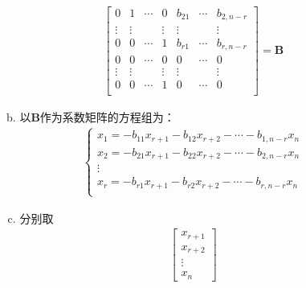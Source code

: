 \documentclass[12pt]{book}
\begin{document}
\begin{enumerate}[1.]
\begin{enumerate}[(1)]
\begin{enumerate}[a.]
\begin{gather*}
\begin{bmatrix}
                                      0      & 1      & \cdots & 0      & b_{21} & \cdots & b_{2,n-r} \\
                                      \vdots & \vdots &        & \vdots & \vdots &        & \vdots    \\
                                      0      & 0      & \cdots & 1      & b_{r1} & \cdots & b_{r,n-r} \\
                                      0      & 0      & \cdots & 0      & 0      & \cdots & 0         \\
                                      \vdots & \vdots &        & \vdots & \vdots &        & \vdots    \\
                                      0      & 0      & \cdots & 1      & 0      & \cdots & 0         \\
                                  \end{bmatrix}=\bm{B}
                              \end{gather*}
                        \item 以$\bm{B}$作为系数矩阵的方程组为：
                              \begin{gather*}
                                  \begin{cases}
                                      x_1 = -b_{11} x_{r+1} - b_{12} x_{r+2} - \cdots - b_{1,n-r} x_{n} \\
                                      x_2 = -b_{21} x_{r+1} - b_{22} x_{r+2} - \cdots - b_{2,n-r} x_{n} \\
                                      \vdots                                                            \\
                                      x_r = -b_{r1} x_{r+1} - b_{r2} x_{r+2} - \cdots - b_{r,n-r} x_{n} \\
                                  \end{cases}
                              \end{gather*}
                        \item 分别取
                              \begin{gather*}
                                  \begin{bmatrix}
                                      x_{r+1} \\x_{r+2}\\\vdots\\x_n
                                  \end{bmatrix}

\end{gather*}
\end{enumerate}
\end{enumerate}
\end{enumerate}
\end{document}
